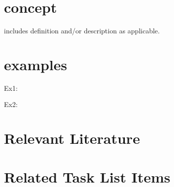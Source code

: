 
\section{concept}
includes definition and/or description as applicable. 

\section{examples}
Ex1:

Ex2:

\section{Relevant Literature}

\section{Related Task List Items}



